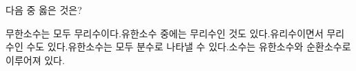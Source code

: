 다음 중 옳은 것은?
\begin{choicesv}{무한소수는 모두 무리수이다.}{유한소수 중에는 무리수인 것도 있다.}{유리수이면서 무리수인 수도 있다.}{유한소수는 모두 분수로 나타낼 수 있다.}{소수는 유한소수와 순환소수로 이루어져 있다.}\end{choicesv}
